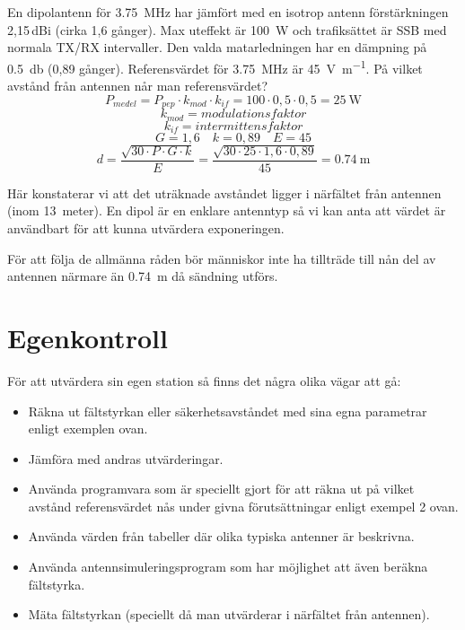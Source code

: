 \begin{tcolorbox}[title=Exempel 3]
En dipolantenn för \qty{3,75}{\mega\hertz} har jämfört med en isotrop antenn
förstärkningen 2,15\,dBi (cirka 1,6 gånger).
Max uteffekt är \qty{100}{\watt} och trafiksättet är SSB med normala TX/RX
intervaller.
Den valda matarledningen har en dämpning på \qty{0,5}{\decibel} (0,89 gånger).
Referensvärdet för \qty{3,75}{\mega\hertz} är \qty{45}{\volt\per\metre}.
På vilket avstånd från antennen når man referensvärdet?
\tcblower
\[P_{medel} = P_{pep} \cdot k_{mod} \cdot k_{if}
= 100 \cdot 0,5 \cdot 0,5 = \qty{25}{\watt}\]
\[k_{mod} = modulationsfaktor\]
\[k_{if} = intermittensfaktor\]
\[G = 1,6 \quad k = 0,89 \quad E = 45\]
\[d = \dfrac{\sqrt{30 \cdot P \cdot G \cdot k}}{E} = \dfrac{\sqrt{30 \cdot 25 \cdot 1,6 \cdot 0,89}}{45}
= \qty{0,74}{\metre}\]

Här konstaterar vi att det uträknade avståndet ligger i närfältet från antennen
(inom 13~meter).
En dipol är en enklare antenntyp så vi kan anta att värdet är användbart för att
kunna utvärdera exponeringen.

För att följa de allmänna råden bör människor inte ha tillträde till nån del av
antennen närmare än \qty{0,74}{\metre} då sändning utförs.
\end{tcolorbox}

\section{Egenkontroll}

För att utvärdera sin egen station så finns det några olika vägar att gå:

\begin{itemize}
\item Räkna ut fältstyrkan eller säkerhetsavståndet med sina egna
  parametrar enligt exemplen ovan.
\item Jämföra med andras utvärderingar.
\item Använda programvara som är speciellt gjort för att räkna ut på
  vilket avstånd referensvärdet nås under givna förutsättningar enligt
  exempel 2 ovan.
\item Använda värden från tabeller där olika typiska antenner är beskrivna.
\item Använda antennsimuleringsprogram som har möjlighet att även
  beräkna fältstyrka.
\item Mäta fältstyrkan (speciellt då man utvärderar i närfältet från
  antennen).
\end{itemize}

